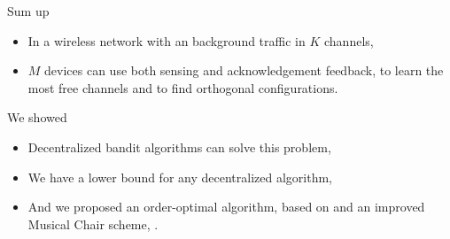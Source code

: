 \documentclass[12pt,english,ignorenonframetext,]{beamer}
\providecommand{\tightlist}{%
  \setlength{\itemsep}{0pt}\setlength{\parskip}{0pt}}
\begin{document}
\begin{frame}{Sum up}








\begin{itemize}\tightlist
\item
  In a wireless network with an \iid{} background traffic in \(K\)
  channels,
\item
  \(M\) devices can use both sensing and acknowledgement feedback, to
  learn the most free channels and to find orthogonal configurations.
\end{itemize}

\begin{block}{We showed}

\begin{itemize}\tightlist
\item
  Decentralized bandit algorithms can solve this problem,
\item
  We have a lower bound for any decentralized algorithm,
\item
  And we proposed an order-optimal algorithm, based on \klUCB{} and an
  improved Musical Chair scheme, \MCTopM.
\end{itemize}

\end{block}

\end{frame}
\end{document}
